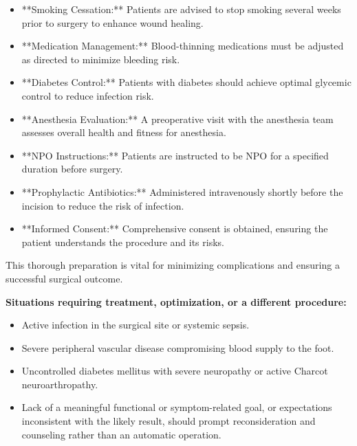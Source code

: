 \begin{itemize}
  \item **Smoking Cessation:** Patients are advised to stop smoking several weeks prior to surgery to enhance wound healing.
  
  \item **Medication Management:** Blood-thinning medications must be adjusted as directed to minimize bleeding risk.
  
  \item **Diabetes Control:** Patients with diabetes should achieve optimal glycemic control to reduce infection risk.
  
  \item **Anesthesia Evaluation:** A preoperative visit with the anesthesia team assesses overall health and fitness for anesthesia.
  
  \item **NPO Instructions:** Patients are instructed to be NPO for a specified duration before surgery.
  
  \item **Prophylactic Antibiotics:** Administered intravenously shortly before the incision to reduce the risk of infection.
  
  \item **Informed Consent:** Comprehensive consent is obtained, ensuring the patient understands the procedure and its risks.
\end{itemize}

This thorough preparation is vital for minimizing complications and ensuring a successful surgical outcome.

\textbf{Situations requiring treatment, optimization, or a different procedure:}
\begin{itemize}
  \item Active infection in the surgical site or systemic sepsis.
  \item Severe peripheral vascular disease compromising blood supply to the foot.
  \item Uncontrolled diabetes mellitus with severe neuropathy or active Charcot neuroarthropathy.
  \item Lack of a meaningful functional or symptom-related goal, or expectations inconsistent with the likely result, should prompt reconsideration and counseling rather than an automatic operation.
\end{itemize}

